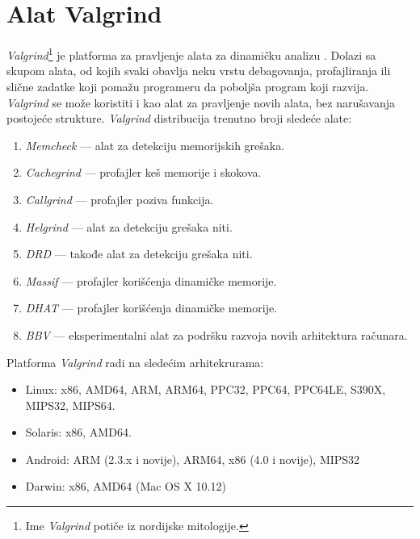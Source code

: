 \documentclass[12pt,oneside]{memoir}
\theoremstyle{plain}
\theoremstyle{definition}
\begin{document}
\chapter{Alat Valgrind}
\textit{Valgrind}\footnote{ Ime \textit{Valgrind} potiče iz nordijske mitologije.} je platforma za pravljenje alata za dinamičku analizu \cite{Valgrind}. Dolazi sa skupom alata, od kojih svaki obavlja neku vrstu debagovanja, profajliranja ili slične zadatke koji pomažu programeru da poboljša program koji razvija. \textit{Valgrind} se može koristiti i kao alat za pravljenje novih alata, bez narušavanja postojeće strukture. 
\textit{Valgrind} distribucija trenutno broji sledeće alate:
\begin{enumerate}
  \item \textit{Memcheck} \cite{Memcheck} --- alat za detekciju memorijskih grešaka.
  \item \textit{Cachegrind}  \cite{Cachegrind} --- profajler keš memorije i skokova. 
  \item \textit{Callgrind} \cite{Callgrind} --- profajler poziva funkcija. %
  \item \textit{Helgrind} \cite{Helgrind} --- alat za detekciju grešaka niti.
  \item \textit{DRD} \cite{Drd} --- takođe alat za detekciju grešaka niti. %
  \item \textit{Massif} \cite{Massif} --- profajler korišćenja dinamičke memorije.
  \item \textit{DHAT} \cite{DHAT} --- profajler korišćenja dinamičke memorije. %
  \item \textit{BBV} \cite{BBV} --- eksperimentalni alat za podršku razvoja novih arhitektura računara. %
\end{enumerate}
Platforma \textit{Valgrind} radi na sledećim arhitekrurama:
\begin{itemize}
  \item Linux: x86, AMD64, ARM, ARM64, PPC32, PPC64, PPC64LE, S390X, MIPS32, MIPS64.
  \item Solaris: x86, AMD64. 
  \item Android: ARM (2.3.x i novije), ARM64, x86 (4.0 i novije), MIPS32 
  \item Darwin: x86, AMD64 (Mac OS X 10.12)\cite{Valgrind}
\end{itemize}
\end{document}
